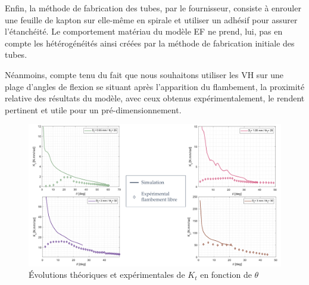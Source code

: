 Enfin, la méthode de fabrication des tubes, par le fournisseur, consiste à enrouler une feuille de kapton sur elle-même en spirale et utiliser un adhésif pour assurer l'étanchéité. Le comportement matériau du modèle EF ne prend, lui, pas en compte les hétérogénéités ainsi créées par la méthode de fabrication initiale des tubes.

Néanmoins, compte tenu du fait que nous souhaitons utiliser les VH sur une plage d'angles de flexion se situant après l'apparition du flambement, la proximité relative des résultats du modèle, avec ceux obtenus expérimentalement, le rendent pertinent et utile pour un pré-dimensionnement.
\begin{figure}[!htb]
	\begin{center}
		\captionsetup{justification=centering}
		\includegraphics[trim={0cm 0cm 0cm 0cm},clip,width=\textwidth]{../Chap5/Figure/resultats_essais_statique_VH_tous_simu_vs_non_plastife.pdf}
		\caption{Évolutions théoriques et expérimentales de $K_t$ en fonction de $\theta$ }
		\label{fig:resultats_essais_statique_VH_tous_simu_vs_non_plastife}
	\end{center}
\end{figure} 
